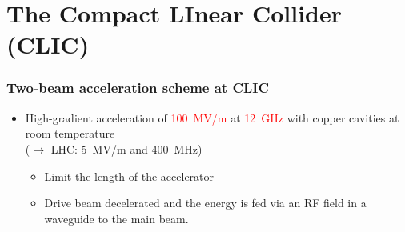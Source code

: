 \section{The Compact LInear Collider (CLIC)}
\begin{frame}
  \frametitle{}
  \tableofcontents[currentsection]
\end{frame}
{
  \begin{frame}
    \frametitle{Two-beam acceleration scheme at CLIC}
    
    \vspace{-1cm}
    \begin{itemize}
    \item High-gradient acceleration of \textcolor{Red}{100~MV/m} at
      \textcolor{Red}{12~GHz} with copper cavities at room temperature\\
      ($\rightarrow$ LHC: 5~MV/m and 400~MHz)
      \begin{itemize}
      \item Limit the length of the accelerator
      \item Drive beam decelerated and the energy is fed via an RF
        field in a waveguide to the main beam.
      \end{itemize}
    \end{itemize}
    

\end{frame}}
